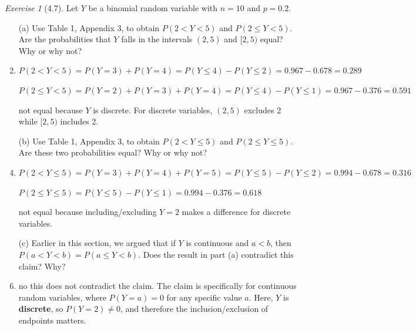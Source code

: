 \documentclass[12pt]{amsart}
\makeatletter
\theoremstyle{remark}
\newtheorem*{exercise}{Exercise}%
\renewenvironment{proof}[1][\proofname]{\par\doublespacing
  \pushQED{\qed}%
  \normalfont \topsep6\p@\@plus6\p@\relax
  \list{}{%
    \settowidth{\leftmargin}{\itshape\proofname:\hskip\labelsep}%
    \setlength{\labelwidth}{0pt}%
    \setlength{\itemindent}{-\leftmargin}%
  }%
  \item[\hskip\labelsep\itshape#1\@addpunct{:}]\ignorespaces
}{%
  \popQED\endlist\@endpefalse
  \singlespacing
}
\theoremstyle{mycomment}
\makeatother
\begin{document}
\begin{exercise}[4.7]
Let $Y$ be a binomial random variable with $n = 10$ and $p = 0.2$.

\begin{enumerate}
    \item[(a)] Use Table 1, Appendix 3, to obtain $P(2 < Y < 5)$ and $P(2 \leq Y < 5)$. Are the probabilities that $Y$ falls in the intervals $(2, 5)$ and $[2, 5)$ equal? Why or why not?
\begin{proof}[Solution]
 $P(2 < Y < 5) = P(Y = 3) + P(Y = 4) = P(Y \leq 4) - P(Y \leq 2) = 0.967 - 0.678 = 0.289$
	
	$P(2 \leq Y < 5) = P(Y = 2) + P(Y = 3) + P(Y = 4) = P(Y \leq 4) - P(Y \leq 1) = 0.967 - 0.376 = 0.591$
	
	not equal because $Y$ is discrete. For discrete variables, $(2,5)$ excludes 2 while $[2,5)$ includes 2.
\end{proof}
    \item[(b)] Use Table 1, Appendix 3, to obtain $P(2 < Y \leq 5)$ and $P(2 \leq Y \leq 5)$. Are these two probabilities equal? Why or why not?
\begin{proof}[Solution]
 $P(2 < Y \leq 5) = P(Y = 3) + P(Y = 4) + P(Y = 5) = P(Y \leq 5) - P(Y \leq 2) = 0.994 - 0.678 = 0.316$
	
	$P(2 \leq Y \leq 5) = P(Y \leq 5) - P(Y \leq 1) = 0.994 - 0.376 = 0.618$
	
	not equal because including/excluding $Y = 2$ makes a difference for discrete variables.
\end{proof}
    \item[(c)] Earlier in this section, we argued that if $Y$ is continuous and $a < b$, then $P(a < Y < b) = P(a \leq Y < b)$. Does the result in part (a) contradict this claim? Why?
\begin{proof}[Solution]
 no this does not contradict the claim. The claim is specifically for continuous random variables, where $P(Y = a) = 0$ for any specific value $a$. Here, $Y$ is \textbf{discrete}, so $P(Y = 2) \neq 0$, and therefore the inclusion/exclusion of endpoints matters.
\end{proof}
\end{enumerate} 
\end{exercise}
\end{document}
